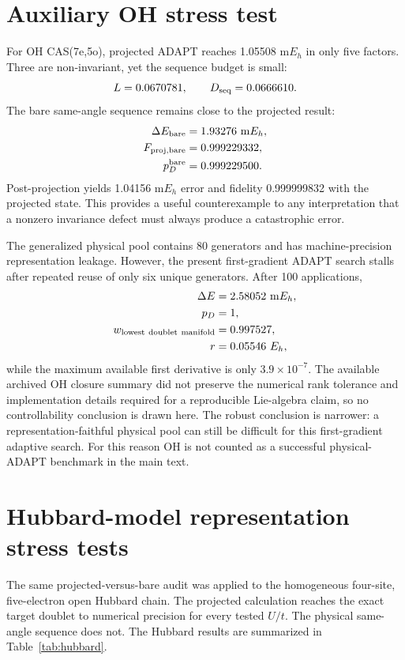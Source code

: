 \documentclass[
 aip,
 jcp,
 amsmath,amssymb,
 preprint
]{revtex4-2}
\begin{document}
\section{Auxiliary OH stress test}

For OH CAS(7e,5o), projected ADAPT reaches 1.05508 m$E_h$ in only five factors.
Three are non-invariant, yet the sequence budget is small:
\begin{equation}
L=0.0670781,\qquad D_{\rm seq}=0.0666610.
\end{equation}
The bare same-angle sequence remains close to the projected result:
\begin{align}
\Delta E_{\rm bare}&=1.93276~{\rm m}E_h,\\
F_{\rm proj,bare}&=0.999229332,\\
p_D^{\rm bare}&=0.999229500.
\end{align}
Post-projection yields 1.04156 m$E_h$ error and fidelity 0.999999832 with the projected state.
This provides a useful counterexample to any interpretation that a nonzero invariance defect must always produce a catastrophic error.

The generalized physical pool contains 80 generators and has machine-precision representation leakage.
However, the present first-gradient ADAPT search stalls after repeated reuse of only six unique generators.
After 100 applications,
\begin{align}
\Delta E&=2.58052~{\rm m}E_h,\\
p_D&=1,\\
w_{\rm lowest\ doublet\ manifold}&=0.997527,\\
r&=0.05546~E_h,
\end{align}
while the maximum available first derivative is only $3.9\times10^{-7}$.
The available archived OH closure summary did not preserve the numerical rank tolerance and implementation details required for a reproducible Lie-algebra claim, so no controllability conclusion is drawn here.
The robust conclusion is narrower: a representation-faithful physical pool can still be difficult for this first-gradient adaptive search.
For this reason OH is not counted as a successful physical-ADAPT benchmark in the main text.

\section{Hubbard-model representation stress tests}

The same projected-versus-bare audit was applied to the homogeneous four-site, five-electron open Hubbard chain.
The projected calculation reaches the exact target doublet to numerical precision for every tested $U/t$.
The physical same-angle sequence does not.
The Hubbard results are summarized in Table~\ref{tab:hubbard}.
\end{document}
